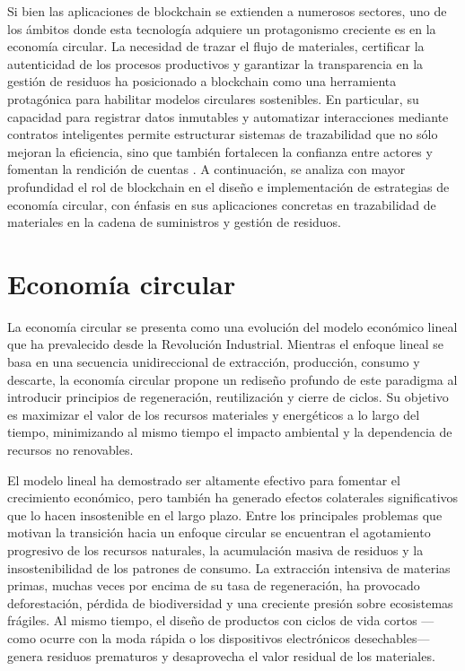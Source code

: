 Si bien las aplicaciones de blockchain se extienden a numerosos sectores, uno de los ámbitos donde esta tecnología adquiere un protagonismo creciente es en la economía circular. La necesidad de trazar el flujo de materiales, certificar la autenticidad de los procesos productivos y garantizar la transparencia en la gestión de residuos ha posicionado a blockchain como una herramienta protagónica para habilitar modelos circulares sostenibles. En particular, su capacidad para registrar datos inmutables y automatizar interacciones mediante contratos inteligentes permite estructurar sistemas de trazabilidad que no sólo mejoran la eficiencia, sino que también fortalecen la confianza entre actores y fomentan la rendición de cuentas \cite{sharabati2024blockchain, rejeb2023role}. A continuación, se analiza con mayor profundidad el rol de blockchain en el diseño e implementación de estrategias de economía circular, con énfasis en sus aplicaciones concretas en trazabilidad de materiales en la cadena de suministros y gestión de residuos.

\section{Economía circular}

La economía circular se presenta como una evolución del modelo económico lineal que ha prevalecido desde la Revolución Industrial. Mientras el enfoque lineal se basa en una secuencia unidireccional de extracción, producción, consumo y descarte, la economía circular propone un rediseño profundo de este paradigma al introducir principios de regeneración, reutilización y cierre de ciclos. Su objetivo es maximizar el valor de los recursos materiales y energéticos a lo largo del tiempo, minimizando al mismo tiempo el impacto ambiental y la dependencia de recursos no renovables.

El modelo lineal ha demostrado ser altamente efectivo para fomentar el crecimiento económico, pero también ha generado efectos colaterales significativos que lo hacen insostenible en el largo plazo. Entre los principales problemas que motivan la transición hacia un enfoque circular se encuentran el agotamiento progresivo de los recursos naturales, la acumulación masiva de residuos y la insostenibilidad de los patrones de consumo. La extracción intensiva de materias primas, muchas veces por encima de su tasa de regeneración, ha provocado deforestación, pérdida de biodiversidad y una creciente presión sobre ecosistemas frágiles. Al mismo tiempo, el diseño de productos con ciclos de vida cortos —como ocurre con la moda rápida o los dispositivos electrónicos desechables— genera residuos prematuros y desaprovecha el valor residual de los materiales. %

